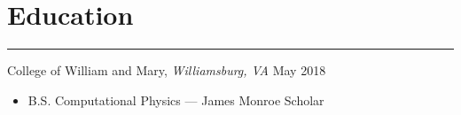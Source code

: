 \documentclass[12pt]{article}
\begin{document}



\vspace{-0.50cm}
\section*{Education}
\vspace{-0.1cm}
\hrule
\vspace{0.25cm}

\noindent College of William and Mary, \textit{Williamsburg, VA} \hfill May 2018
\vspace{-0.1cm}
\begin{itemize}
  \itemsep-0.4em
        \item B.S. Computational Physics --- James Monroe Scholar
\end{itemize}
\end{document}
